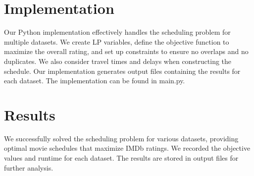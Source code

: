 \documentclass{article}
\begin{document}
\section{Implementation}
Our Python implementation effectively handles the scheduling problem for multiple datasets. We create LP variables, define the objective function to maximize the overall rating, and set up constraints to ensure no overlaps and no duplicates. We also consider travel times and delays when constructing the schedule. Our implementation generates output files containing the results for each dataset.
The implementation can be found in main.py.

\section{Results}
We successfully solved the scheduling problem for various datasets, providing optimal movie schedules that maximize IMDb ratings. We recorded the objective values and runtime for each dataset. The results are stored in output files for further analysis.
\end{document}
